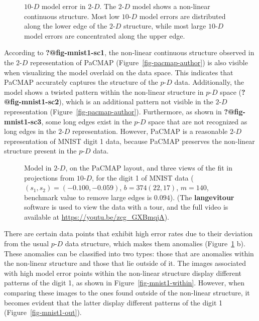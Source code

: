 \documentclass[
  12pt]{article}
\newcommand\pD{$p\text{-}D$}
\newcommand\gD{$2\text{-}D$}
\begin{document}
\begin{figure}[H]


\caption{\label{fig-model-mnist}\(10\text{-}D\) model error in
\(2\text{-}D\). The \(2\text{-}D\) model shows a non-linear continuous
structure. Most low \(10\text{-}D\) model errors are distributed along
the lower edge of the \(2\text{-}D\) structure, while most large
\(10\text{-}D\) model errors are concentrated along the upper edge.}

\end{figure}%

According to \textbf{?@fig-mnist1-sc1}, the non-linear continuous
structure observed in the \gD{} representation of PaCMAP
(Figure~\ref{fig-pacmap-author}) is also visible when visualizing the
model overlaid on the data space. This indicates that PaCMAP accurately
captures the structure of the \pD{} data. Additionally, the model shows
a twisted pattern within the non-linear structure in \pD{} space
(\textbf{?@fig-mnist1-sc2}), which is an additional pattern not visible
in the \gD{} representation (Figure~\ref{fig-pacmap-author}).
Furthermore, as shown in \textbf{?@fig-mnist1-sc3}, some long edges
exist in the \pD{} space that are not recognized as long edges in the
\gD{} representation. However, PaCMAP is a reasonable \gD{}
representation of MNIST digit 1 data, because PaCMAP preserves the
non-linear structure present in the \pD{} data.

\begin{figure}[H]


\caption{\label{fig-mnist-tri-proj}Model in \gD{}, on the PaCMAP layout,
and three views of the fit in projections from \(10\text{-}D\), for the
digit 1 of MNIST data (\((s_1,  s_2) = (-0.100,  -0.059)\),
\(b = 374   (22,  17)\), \(m = 140\), benchmark value to remove large
edges is \(0.094\)). (The \textbf{langevitour} software is used to view
the data with a tour, and the full video is available at
\url{https://youtu.be/zcg_GXBmqjA}).}

\end{figure}%

There are certain data points that exhibit high error rates due to their
deviation from the usual \pD{} data structure, which makes them
anomalies (Figure~\ref{fig-model-mnist} b). These anomalies can be
classified into two types: those that are anomalies within the
non-linear structure and those that lie outside of it. The images
associated with high model error points within the non-linear structure
display different patterns of the digit 1, as shown in
Figure~\ref{fig-mnist1-within}. However, when comparing these images to
the ones found outside of the non-linear structure, it becomes evident
that the latter display different patterns of the digit 1
(Figure~\ref{fig-mnist1-out}).
\end{document}
